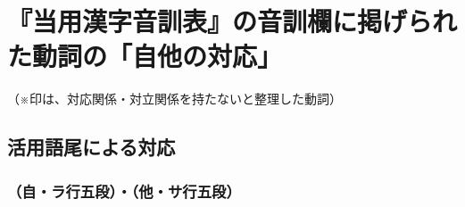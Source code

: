 \chapter{\hspace{-2\zw}『当用漢字音訓表』の音訓欄に掲げられた動詞の「自他の対応」}

\vspace{-2.5\zw}
\begin{flushright}
\large（※印は、対応関係・対立関係を持たないと整理した動詞）\hspace*{1\zw}
\end{flushright}

\section[活用語尾による対応]{活用語尾による対応}

\subsection{（自・ラ行五段）・（他・サ行五段）}


